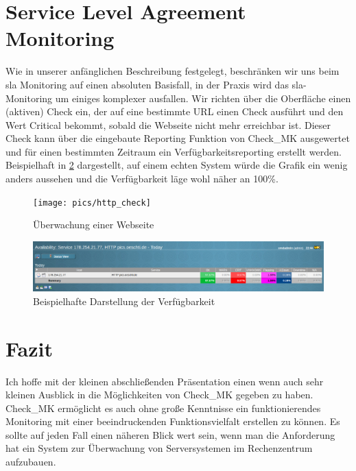\documentclass[12pt,a4paper,parskip,listof=totoc,bibliography=totoc]{scrreprt}
\begin{document}
	\section{Service Level Agreement Monitoring}
	Wie in unserer anfänglichen Beschreibung festgelegt, beschränken wir uns beim \acrshort{sla} Monitoring auf einen absoluten Basisfall, in der Praxis wird das \acrshort{sla}-Monitoring um einiges komplexer ausfallen. Wir richten über die Oberfläche einen (aktiven) Check ein, der auf eine bestimmte URL einen Check ausführt und den Wert Critical bekommt, sobald die Webseite nicht mehr erreichbar ist. Dieser Check kann über die eingebaute Reporting Funktion von Check\_MK ausgewertet und für einen bestimmten Zeitraum ein Verfügbarkeitsreporting erstellt werden. Beispielhaft in \ref{fig:availability} dargestellt, auf einem echten System würde die Grafik ein wenig anders aussehen und die Verfügbarkeit läge wohl näher an 100\%.
	\begin{figure}[h!]
	\centering
	\texttt{[image: pics/http\_check]}
	\caption[Überwachung einer Webseite]{Überwachung einer Webseite}
	\label{fig:http_check}
	\end{figure}
	\begin{figure}[h!]
	\centering
	\includegraphics[width=1\linewidth]{pics/availability}
	\caption[Beispielhafte Darstellung der Verfügbarkeit]{Beispielhafte Darstellung der Verfügbarkeit}
	\label{fig:availability}
	\end{figure}
	\section{Fazit}
	Ich hoffe mit der kleinen abschließenden Präsentation einen wenn auch sehr kleinen Ausblick in die Möglichkeiten von Check\_MK gegeben zu haben. Check\_MK ermöglicht es auch ohne große Kenntnisse ein funktionierendes Monitoring mit einer beeindruckenden Funktionsvielfalt erstellen zu können. Es sollte auf jeden Fall einen näheren Blick wert sein, wenn man die Anforderung hat ein System zur Überwachung von Serversystemen im Rechenzentrum aufzubauen.
	


	
	
	\printbibliography 
	\printglossary[title=Abkürzungsverzeichnis, type=\acronymtype] %
	\listoffigures %
\end{document}
